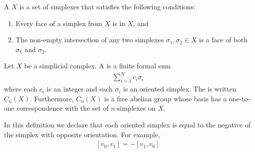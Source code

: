     \begin{definition}\label{def:simplicial-complex}
        A  $X$ is a set of simplexes that satisfies the following conditions:
            \begin{enumerate}[label = (\arabic*)]
                \item Every face of a simplex from $X$ is in $X$, and 
                \item The non-empty intersection of any two simplexes $\sigma_1,\sigma_2 \in X$ is a face of both $\sigma_1$ and $\sigma_2$.
            \end{enumerate}
    \end{definition}
    \begin{definition}\label{def:simplicial-chain}
        Let $X$ be a simplicial complex. A  is a finite formal sum
            \begin{equation*}
            \begin{split}
                \sum_{i=1}^{N}c_i \sigma_i
            \end{split}
            \end{equation*}
        where each $c_i$ is an integer and each $\sigma_i$ is an oriented simplex. The  is written $C_n(X)$. Furthermore, $C_n(X)$ is a free abelian group whose basis has a one-to-one correspondence with the set of $n$-simplexes on $X$.
    \end{definition}

    \begin{note}
        In this definition we declare that each oriented simplex is equal to the negative of the simplex with opposite orientation. For example, 
            \begin{equation*}
            \begin{split}
                [v_0,v_1] = -[v_1,v_0]
            \end{split}
            \end{equation*}
    \end{note}


